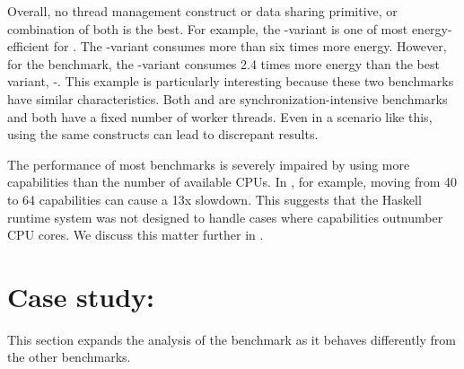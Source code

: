  Overall, no thread management construct or data sharing primitive, or combination of both is the best. For example, the \forkIO-\TMVar variant is one of most energy-efficient for \dining. The \forkOS-\TMVar variant consumes more than six times more energy. However, for the \chameneos benchmark, the \forkIO-\TMVar variant consumes 2.4 times more energy than the best variant, \forkIO-\MVar. This example is particularly interesting because these two benchmarks have similar characteristics. Both \dining and \chameneos are synchronization-intensive benchmarks and both have a fixed number of worker threads. Even in a scenario like this, using the same constructs can lead to discrepant results.
\newline

 The performance of most benchmarks is severely impaired by using more capabilities than the number of available CPUs. In \chameneos, for example, moving from 40 to 64 capabilities can cause a 13x slowdown. This suggests that the Haskell runtime system was not designed to handle cases where capabilities outnumber CPU cores.
We discuss this matter further in .


\section{Case study: \fasta}\label{sec:fasta}
This section expands the analysis of the \fasta benchmark as it behaves differently from the other benchmarks.

